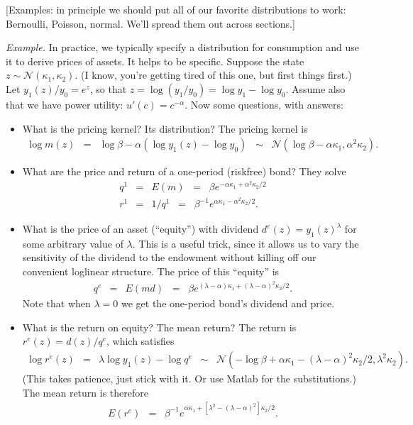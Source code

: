 \documentclass[11pt]{article}
\begin{document}
[Examples:  in principle we should put all of our favorite
distributions to work:  Bernoulli, Poisson, normal.
We'll spread them out across sections.]


{\it Example.\/}
In practice, we typically specify a distribution for consumption
and use it to derive prices of assets.
It helps to be specific.
Suppose the state $z \sim \mathcal{N}(\kappa_1,\kappa_2)$.
(I know, you're getting tired of this one, but first things first.)
Let $y_1(z)/y_0 = e^z$, so that $z = \log (y_1/y_0) = \log y_1 - \log y_0$.
Assume also that we have power utility:  $u'(c) = c^{-\alpha}$.
Now some questions, with answers:
\begin{itemize}
\item What is the pricing kernel?  Its distribution?
The pricing kernel is
\begin{eqnarray*}
    \log m(z) &=& \log \beta - \alpha (\log y_1(z) - \log y_0)
            \;\;\sim \;\; \mathcal{N}(\log \beta - \alpha \kappa_1, \alpha^2 \kappa_2) .
\end{eqnarray*}
\item What are the price and return of a one-period (riskfree) bond?
They solve
\begin{eqnarray*}
    q^1 &=& E(m) \;\;=\;\; \beta e^{ - \alpha \kappa_1 + \alpha^2 \kappa_2/2 } \\
    r^1 &=& 1/q^1 \;\;=\;\; \beta^{-1} e^{\alpha \kappa_1 - \alpha^2 \kappa_2/2 } .
\end{eqnarray*}
\item What is the price of an asset (``equity'') with dividend
$d^e(z) = y_1(z)^\lambda$ for some
arbitrary value of $\lambda$.
This is a useful trick, since it allows us to vary the sensitivity of the dividend
to the endowment without killing off our convenient loglinear structure.
The price of this ``equity'' is
\begin{eqnarray*}
    q^e &=& E(md) \;\;=\;\; \beta e^{ (\lambda- \alpha) \kappa_1
    + (\lambda-\alpha)^2 \kappa_2/2 } .
\end{eqnarray*}
Note that when $\lambda = 0$ we get the one-period bond's dividend and price.
\item What is the return on equity?  The mean return?
The return is $r^e(z) = d(z)/q^e$, which satisfies
\begin{eqnarray*}
    \log r^e(z) &=& \lambda \log y_1(z) - \log q^e
            \;\;\sim \;\; \mathcal{N}
            (-\log \beta + \alpha \kappa_1 - (\lambda-\alpha)^2 \kappa_2/2, \lambda^2 \kappa_2) .
\end{eqnarray*}
(This takes patience, just stick with it.  Or use Matlab for the substitutions.)
The mean return is therefore
\begin{eqnarray*}
    E (r^e) &=& \beta^{-1} e^{\alpha \kappa_1 + [\lambda^2 - (\lambda-\alpha)^2] \kappa_2/2 } .
\end{eqnarray*}


\end{itemize}
\end{document}
